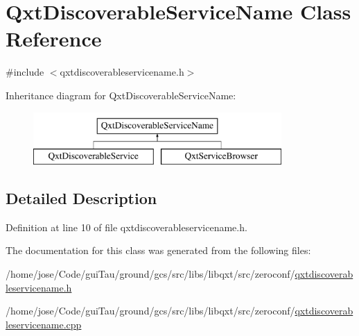 \hypertarget{class_qxt_discoverable_service_name}{\section{Qxt\-Discoverable\-Service\-Name Class Reference}
\label{class_qxt_discoverable_service_name}
}


{\ttfamily \#include $<$qxtdiscoverableservicename.\-h$>$}

Inheritance diagram for Qxt\-Discoverable\-Service\-Name\-:\begin{figure}[H]
\begin{center}
\leavevmode
\includegraphics[height=2.000000cm]{class_qxt_discoverable_service_name}
\end{center}
\end{figure}


\subsection{Detailed Description}


Definition at line 10 of file qxtdiscoverableservicename.\-h.



The documentation for this class was generated from the following files\-:\begin{DoxyCompactItemize}
\item 
/home/jose/\-Code/gui\-Tau/ground/gcs/src/libs/libqxt/src/zeroconf/\hyperlink{qxtdiscoverableservicename_8h}{qxtdiscoverableservicename.\-h}\item 
/home/jose/\-Code/gui\-Tau/ground/gcs/src/libs/libqxt/src/zeroconf/\hyperlink{qxtdiscoverableservicename_8cpp}{qxtdiscoverableservicename.\-cpp}\end{DoxyCompactItemize}
